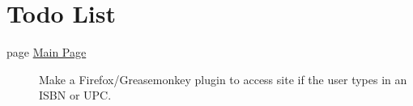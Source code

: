 \hypertarget{todo}{}\section{Todo List}\label{todo}
\label{todo__todo000001}
\hypertarget{todo__todo000001}{}
 \begin{description}
\item[page \hyperlink{index}{Main Page} ]Make a Firefox/Greasemonkey plugin to access site if the user types in an ISBN or UPC.

\end{description}
